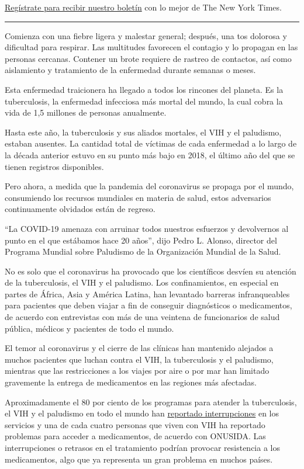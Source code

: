 \href{https://www.nytimes3xbfgragh.onion/newsletters/el-times}{Regístrate
para recibir nuestro boletín} con lo mejor de The New York Times.

\begin{center}\rule{0.5\linewidth}{\linethickness}\end{center}

Comienza con una fiebre ligera y malestar general; después, una tos
dolorosa y dificultad para respirar. Las multitudes favorecen el
contagio y lo propagan en las personas cercanas. Contener un brote
requiere de rastreo de contactos, así como aislamiento y tratamiento de
la enfermedad durante semanas o meses.

Esta enfermedad traicionera ha llegado a todos los rincones del planeta.
Es la tuberculosis, la enfermedad infecciosa más mortal del mundo, la
cual cobra la vida de 1,5 millones de personas anualmente.

Hasta este año, la tuberculosis y sus aliados mortales, el VIH y el
paludismo, estaban ausentes. La cantidad total de víctimas de cada
enfermedad a lo largo de la década anterior estuvo en su punto más bajo
en 2018, el último año del que se tienen registros disponibles.

Pero ahora, a medida que la pandemia del coronavirus se propaga por el
mundo, consumiendo los recursos mundiales en materia de salud, estos
adversarios continuamente olvidados están de regreso.

``La COVID-19 amenaza con arruinar todos nuestros esfuerzos y
devolvernos al punto en el que estábamos hace 20 años'', dijo Pedro L.
Alonso, director del Programa Mundial sobre Paludismo de la Organización
Mundial de la Salud.

No es solo que el coronavirus ha provocado que los científicos desvíen
su atención de la tuberculosis, el VIH y el paludismo. Los
confinamientos, en especial en partes de África, Asia y América Latina,
han levantado barreras infranqueables para pacientes que deben viajar a
fin de conseguir diagnósticos o medicamentos, de acuerdo con entrevistas
con más de una veintena de funcionarios de salud pública, médicos y
pacientes de todo el mundo.

El temor al coronavirus y el cierre de las clínicas han mantenido
alejados a muchos pacientes que luchan contra el VIH, la tuberculosis y
el paludismo, mientras que las restricciones a los viajes por aire o por
mar han limitado gravemente la entrega de medicamentos en las regiones
más afectadas.

Aproximadamente el 80 por ciento de los programas para atender la
tuberculosis, el VIH y el paludismo en todo el mundo han
\href{https://www.theglobalfund.org/en/covid-19/news/2020-06-17-global-fund-survey-majority-of-hiv-tb-and-malaria-programs-face-disruptions-as-a-result-of-covid-19/}{reportado
interrupciones} en los servicios y una de cada cuatro personas que viven
con VIH ha reportado problemas para acceder a medicamentos, de acuerdo
con ONUSIDA. Las interrupciones o retrasos en el tratamiento podrían
provocar resistencia a los medicamentos, algo que ya representa un gran
problema en muchos países.


